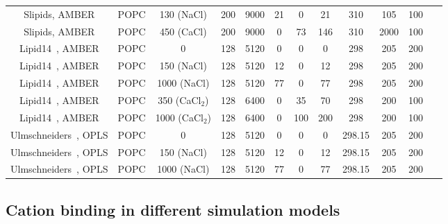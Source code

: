 \documentclass[twoside,twocolumn,9pt]{article}
\begin{document}
\begin{table}
\begin{tabular}{c c c c c c c c c c c c}
  Slipids\cite{jambeck12b}, AMBER\cite{smith94}  &  POPC & 130 (NaCl) & 200 & 9000 & 21 & 0  & 21 & 310 & 105 & 100 &~\cite{slipidsFILESpopc130mMnaclSD}  \\
  Slipids\cite{jambeck12b}, AMBER\cite{aqvist90}  &  POPC & 450 (CaCl) & 200 & 9000  & 0 & 73  & 146 & 310 & 2000 & 100 &~\cite{slipidsFILESpopc450mMcacl}  \\
  \hline
  Lipid14~\cite{dickson14}, AMBER\cite{aqvist90}  &   POPC & 0          & 128 & 5120 & 0 & 0  & 0 & 298 & 205 & 200 &~\cite{lipid14POPC0mMNaClfiles}  \\
  Lipid14~\cite{dickson14}, AMBER\cite{aqvist90}   &   POPC & 150 (NaCl) & 128 & 5120 & 12 & 0 & 12 & 298 & 205 & 200 &~\cite{lipid14POPC150mMNaClfiles}  \\
  Lipid14~\cite{dickson14}, AMBER\cite{aqvist90}   &   POPC & 1000 (NaCl) & 128 & 5120 & 77 & 0 & 77 & 298 & 205 & 200 &~\cite{lipid14POPC1000mMNaClfiles}  \\
  Lipid14~\cite{dickson14}, AMBER\cite{aqvist90}   &   POPC & 350 (CaCl$_2$) & 128 & 6400 & 0 & 35 & 70 & 298 & 200 & 100 &~\cite{lipid14POPC350mMCaClfiles}  \\
  Lipid14~\cite{dickson14}, AMBER\cite{aqvist90}   &   POPC & 1000 (CaCl$_2$) & 128 & 6400 & 0 & 100 & 200 & 298 & 200 & 100 &~\cite{lipid14POPC1000mMCaClfiles}  \\
  \hline
  Ulmschneiders~\cite{Ulmschneider09}, OPLS\cite{aqvist90}       &   POPC & 0          & 128 & 5120 & 0 & 0  & 0 & 298.15 & 205 & 200 &~\cite{ulmschneiderPOPC0mMNaClfiles}  \\
  Ulmschneiders~\cite{Ulmschneider09}, OPLS\cite{aqvist90}       &   POPC & 150 (NaCl) & 128 & 5120 & 12 & 0  & 12 & 298.15 & 205 & 200 &~\cite{ulmschneiderPOPC150mMNaClfiles}  \\
  Ulmschneiders~\cite{Ulmschneider09}, OPLS\cite{aqvist90}       &   POPC & 1000 (NaCl) & 128 & 5120 & 77 & 0  & 77 & 298.15 & 205 & 200 &~\cite{ulmschneiderPOPC1000mMNaClfiles}  \\
\end{tabular}
\end{table} 








\subsection{Cation binding in different simulation models}
\end{document}
